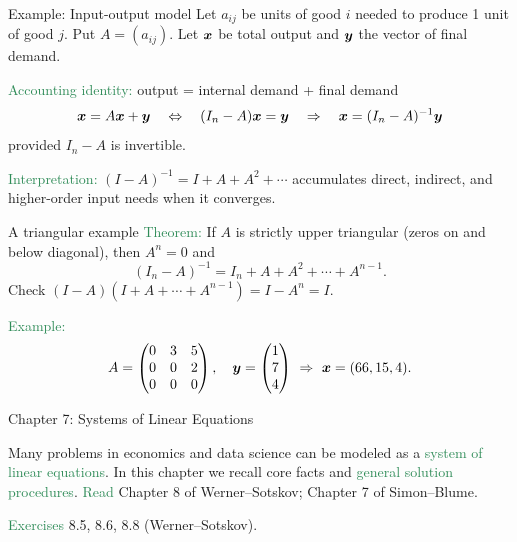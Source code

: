 \documentclass{beamer}
\begin{document}

\begin{frame}{Example: Input-output model}
Let $a_{ij}$ be units of good $i$ needed to produce 1 unit of good $j$. Put $A=(a_{ij})$.
Let $\boldsymbol x$ be total output and $\boldsymbol y$ the vector of final demand.
\bigskip

\textcolor{SeaGreen}{Accounting identity:} output = internal demand + final demand
\[
\boldsymbol x = A\boldsymbol x + \boldsymbol y
\quad\Leftrightarrow\quad
(I_n-A)\boldsymbol x=\boldsymbol y
\quad\Rightarrow\quad
\boldsymbol x=(I_n-A)^{-1}\boldsymbol y
\]
provided $I_n-A$ is invertible.
\bigskip

\textcolor{SeaGreen}{Interpretation:} $(I-A)^{-1}=I+A+A^2+\cdots$ accumulates direct, indirect, and higher-order input needs when it converges.
\end{frame}

\begin{frame}{A triangular example}
\textcolor{SeaGreen}{Theorem:} If $A$ is strictly upper triangular (zeros on and below diagonal), then $A^n=0$ and
\[
(I_n-A)^{-1}=I_n+A+A^2+\cdots+A^{n-1}.
\]
{\tiny Check $(I-A)(I+A+\cdots+A^{n-1})=I-A^n=I$.}
\bigskip

\textcolor{SeaGreen}{Example:}
\[
A=\begin{pmatrix}
0&3&5\\
0&0&2\\
0&0&0
\end{pmatrix},\quad
\boldsymbol y=\begin{pmatrix}1\\ 7\\ 4\end{pmatrix}
\ \Rightarrow\
\boldsymbol x=(66,15,4).
\]
\end{frame}


\begin{frame}{Chapter 7: Systems of Linear Equations}
 
Many problems in economics and data science can be modeled as a \textcolor{SeaGreen}{system of linear equations}.
\vskip 8pt
In this chapter we recall core facts and \textcolor{SeaGreen}{general solution procedures}.
\vskip 8pt
\textcolor{SeaGreen}{Read} Chapter 8 of Werner--Sotskov; Chapter 7 of Simon--Blume. \quad
\bigskip

\textcolor{SeaGreen}{Exercises} 8.5, 8.6, 8.8 (Werner--Sotskov).
\end{frame}
\end{document}
